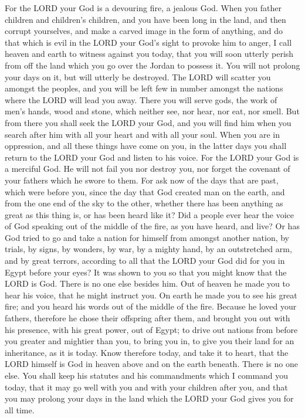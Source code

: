  For the LORD your God is a devouring fire, a jealous God.
 When you father children and children's children, and you
have been long in the land, and then corrupt yourselves, and make a
carved image in the form of anything, and do that which is evil in the
LORD your God's sight to provoke him to anger,  I call
heaven and earth to witness against you today, that you will soon
utterly perish from off the land which you go over the Jordan to possess
it. You will not prolong your days on it, but will utterly be destroyed.
 The LORD will scatter you amongst the peoples, and you
will be left few in number amongst the nations where the LORD will lead
you away.  There you will serve gods, the work of men's
hands, wood and stone, which neither see, nor hear, nor eat, nor smell.
 But from there you shall seek the LORD your God, and you
will find him when you search after him with all your heart and with all
your soul.  When you are in oppression, and all these
things have come on you, in the latter days you shall return to the LORD
your God and listen to his voice.  For the LORD your God is
a merciful God. He will not fail you nor destroy you, nor forget the
covenant of your fathers which he swore to them.  For ask
now of the days that are past, which were before you, since the day that
God created man on the earth, and from the one end of the sky to the
other, whether there has been anything as great as this thing is, or has
been heard like it?  Did a people ever hear the voice of
God speaking out of the middle of the fire, as you have heard, and live?
 Or has God tried to go and take a nation for himself from
amongst another nation, by trials, by signs, by wonders, by war, by a
mighty hand, by an outstretched arm, and by great terrors, according to
all that the LORD your God did for you in Egypt before your eyes?
 It was shown to you so that you might know that the LORD
is God. There is no one else besides him.  Out of heaven he
made you to hear his voice, that he might instruct you. On earth he made
you to see his great fire; and you heard his words out of the middle of
the fire.  Because he loved your fathers, therefore he
chose their offspring after them, and brought you out with his presence,
with his great power, out of Egypt;  to drive out nations
from before you greater and mightier than you, to bring you in, to give
you their land for an inheritance, as it is today.  Know
therefore today, and take it to heart, that the LORD himself is God in
heaven above and on the earth beneath. There is no one else.
 You shall keep his statutes and his commandments which I
command you today, that it may go well with you and with your children
after you, and that you may prolong your days in the land which the LORD
your God gives you for all time.

